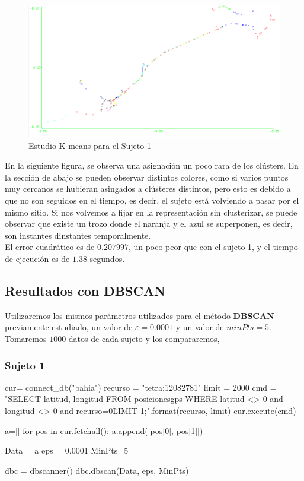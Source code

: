 \documentclass[a4paper, 12pt]{article}
\begin{document}
\begin{figure}[H]
	\includegraphics[scale=.5]{../comparativa/kMeansSujeto2.png}
	\caption{Estudio K-means para el Sujeto 1}
\end{figure}

En la siguiente figura, se observa una asignaci\'on un poco rara de los cl\'usters. En la secci\'on de abajo se pueden observar distintos colores, como si varios puntos muy cercanos se hubieran asingados a cl\'usteres distintos, pero esto es debido a que no son seguidos en el tiempo, es decir, el sujeto est\'a volviendo a pasar por el mismo sitio. Si nos volvemos a fijar en la representaci\'on sin clusterizar, se puede observar que existe un trozo donde el naranja y el azul se superponen, es decir, son instantes dinstantes temporalmente.\\

El error cuadr\'atico es de $0.207997$, un poco peor que con el sujeto 1, y el tiempo de ejecuci\'on es de $1.38$ segundos.\\

\subsection{Resultados con DBSCAN}

Utilizaremos los mismos par\'ametros utilizados para el m\'etodo \textbf{DBSCAN} previamente estudiado, un valor de $\varepsilon = 0.0001$ y un valor de $minPts = 5$. Tomaremos $1000$ datos de cada sujeto y los compararemos,\\

\subsubsection{Sujeto 1}

\begin{python}
cur= connect_db("bahia")
recurso = "tetra:12082781"
limit = 2000
cmd = "SELECT latitud, longitud 
		FROM posicionesgps 
		WHERE latitud <> 0 and longitud <> 0 and recurso=\"{0}\" 
		LIMIT {1};".format(recurso, limit)
cur.execute(cmd)

a=[]
for pos in cur.fetchall():
    a.append([pos[0], pos[1]])

Data = a
eps = 0.0001
MinPts=5

dbc = dbscanner()
dbc.dbscan(Data, eps, MinPts)
\end{python}
\end{document}
